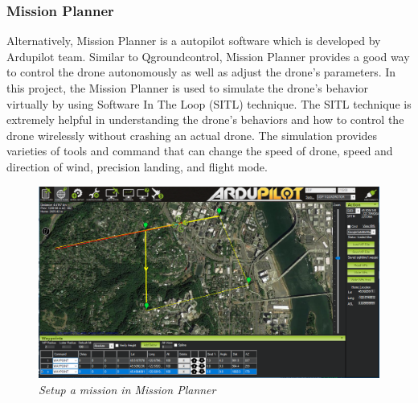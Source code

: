 \documentclass[11pt]{article}
\begin{document}
\subsubsection{Mission Planner}
Alternatively, Mission Planner is a autopilot software which is developed by Ardupilot team. Similar to Qgroundcontrol, Mission Planner provides a good way to control the drone autonomously as well as adjust the drone's parameters. In this project, the Mission Planner is used to simulate the drone's behavior virtually by using Software In The Loop (SITL) technique. The SITL technique is extremely helpful in understanding the drone's behaviors and how to control the drone wirelessly without crashing an actual drone. The simulation provides varieties of tools and command that can change the speed of drone, speed and direction of wind, precision landing, and flight mode. \newline
\begin{figure}[h!bt]
\centering
\includegraphics[width=4.5 in]{mission}
\caption{\textit{Setup a mission in Mission Planner}}	
\end{figure}
     
\end{document}
